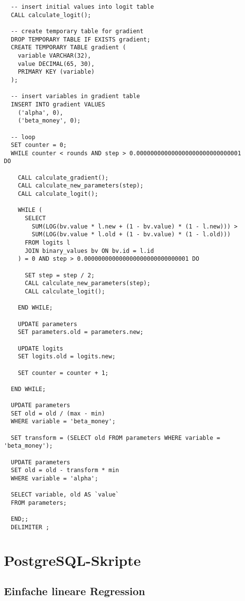 \begin{verbatim}
  -- insert initial values into logit table
  CALL calculate_logit();

  -- create temporary table for gradient
  DROP TEMPORARY TABLE IF EXISTS gradient;
  CREATE TEMPORARY TABLE gradient (
    variable VARCHAR(32),
    value DECIMAL(65, 30),
    PRIMARY KEY (variable)
  );

  -- insert variables in gradient table
  INSERT INTO gradient VALUES
    ('alpha', 0),
    ('beta_money', 0);

  -- loop
  SET counter = 0;
  WHILE counter < rounds AND step > 0.000000000000000000000000000001 DO

    CALL calculate_gradient();
    CALL calculate_new_parameters(step);
    CALL calculate_logit();

    WHILE (
      SELECT
        SUM(LOG(bv.value * l.new + (1 - bv.value) * (1 - l.new))) >
        SUM(LOG(bv.value * l.old + (1 - bv.value) * (1 - l.old)))
      FROM logits l
      JOIN binary_values bv ON bv.id = l.id
    ) = 0 AND step > 0.000000000000000000000000000001 DO

      SET step = step / 2;
      CALL calculate_new_parameters(step);
      CALL calculate_logit();

    END WHILE;

    UPDATE parameters
    SET parameters.old = parameters.new;

    UPDATE logits
    SET logits.old = logits.new;

    SET counter = counter + 1;

  END WHILE;

  UPDATE parameters
  SET old = old / (max - min)
  WHERE variable = 'beta_money';

  SET transform = (SELECT old FROM parameters WHERE variable = 'beta_money');

  UPDATE parameters
  SET old = old - transform * min
  WHERE variable = 'alpha';

  SELECT variable, old AS `value`
  FROM parameters;

  END;;
  DELIMITER ;
\end{verbatim}

\chapter{PostgreSQL-Skripte}

\section{Einfache lineare Regression}

